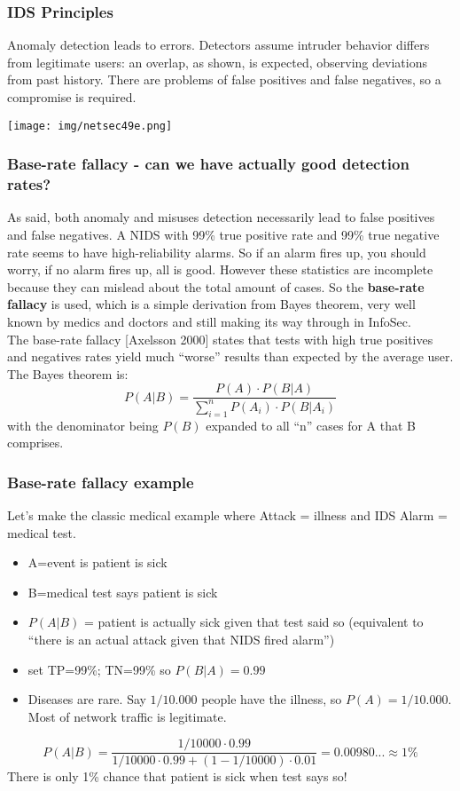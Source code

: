 \documentclass[a4paper, 10pt, titlepage]{article}
\begin{document}
\subsubsection*{IDS Principles}
Anomaly detection leads to errors. Detectors assume intruder behavior differs from legitimate users: an overlap, as shown, is expected, observing deviations from past history. There are problems of false positives and false negatives, so a compromise is required.
\begin{center}
	\texttt{[image: img/netsec49e.png]}
\end{center}

\subsubsection*{Base-rate fallacy - can we have actually good detection rates?}
As said, both anomaly and misuses detection necessarily lead to false positives and false negatives. A NIDS with 99\% true positive rate and 99\% true negative rate seems to have high-reliability alarms. So if an alarm fires up, you should worry, if no alarm fires up, all is good. However these statistics are incomplete because they can mislead about the total amount of cases. So the \textbf{base-rate fallacy} is used, which is a simple derivation from Bayes theorem, very well known by medics and doctors and still making its way through in InfoSec. \medskip\\
The base-rate fallacy [Axelsson 2000] states that tests with high true positives and negatives rates yield much “worse” results than expected by the average user. The Bayes theorem is:
$$P(A|B)= \dfrac{P(A)\cdot P(B|A)}{\sum_{i=1}^{n}P(A_i)\cdot P(B|A_i)}$$
with the denominator being $P(B)$ expanded to all “n” cases for A that B comprises. 

\subsubsection*{Base-rate fallacy example}
Let's make the classic medical example where Attack = illness and IDS Alarm = medical test.
\begin{itemize}
	\item A=event is patient is sick
	\item B=medical test says patient is sick
	\item $P(A|B)$ = patient is actually sick given that test said so (equivalent to “there is an actual attack given that NIDS fired alarm”)
	\item set TP=99\%; TN=99\% so $P(B|A) = 0.99$
	\item Diseases are rare. Say $1/10.000$ people have the illness, so $P(A)=1/10.000$. Most of network traffic is legitimate.
\end{itemize}
$$P(A|B)= \dfrac{1/10000 \cdot 0.99}{1/10000 \cdot 0.99 + (1- 1/10000) \cdot 0.01} = 0.00980... \approx 1 \%$$
There is only 1\% chance that patient is sick when test says so!
\end{document}
